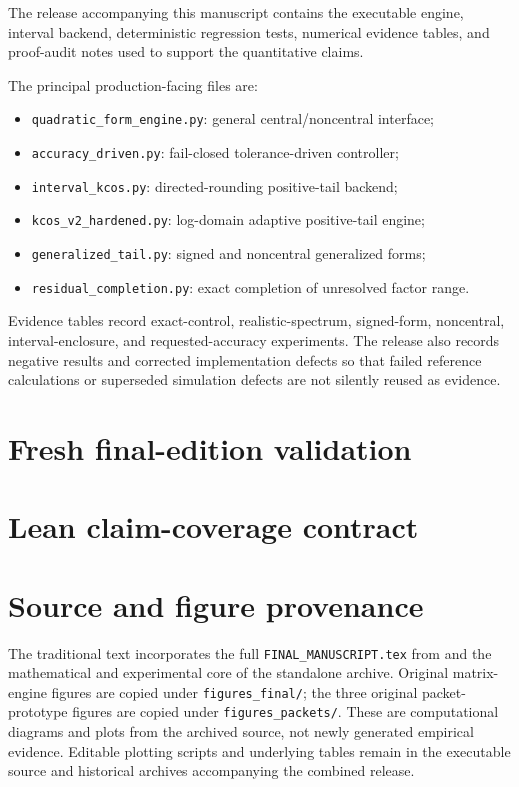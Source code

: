 \documentclass[11pt]{article}
\theoremstyle{definition}
\theoremstyle{remark}
\begin{document}
The release accompanying this manuscript contains the executable engine,
interval backend, deterministic regression tests, numerical evidence tables,
and proof-audit notes used to support the quantitative claims.

The principal production-facing files are:

\begin{itemize}
\item \texttt{quadratic\_form\_engine.py}: general central/noncentral interface;
\item \texttt{accuracy\_driven.py}: fail-closed tolerance-driven controller;
\item \texttt{interval\_kcos.py}: directed-rounding positive-tail backend;
\item \texttt{kcos\_v2\_hardened.py}: log-domain adaptive positive-tail engine;
\item \texttt{generalized\_tail.py}: signed and noncentral generalized forms;
\item \texttt{residual\_completion.py}: exact completion of unresolved factor
range.
\end{itemize}

Evidence tables record exact-control, realistic-spectrum, signed-form,
noncentral, interval-enclosure, and requested-accuracy experiments.  The
release also records negative results and corrected implementation defects so
that failed reference calculations or superseded simulation defects are not
silently reused as evidence.



\section{Fresh final-edition validation}\label{app:fresh-validation}


\section{Lean claim-coverage contract}\label{app:lean-contract}


\section{Source and figure provenance}\label{app:provenance}
The traditional text incorporates the full
\texttt{FINAL\_MANUSCRIPT.tex} from
and the mathematical and experimental core of the standalone
archive.  Original matrix-engine figures are copied under
\texttt{figures\_final/}; the three original packet-prototype figures are
copied under \texttt{figures\_packets/}.  These are computational diagrams and
plots from the archived source, not newly generated empirical evidence.
Editable plotting scripts and underlying tables remain in the executable
source and historical archives accompanying the combined release.
\end{document}

